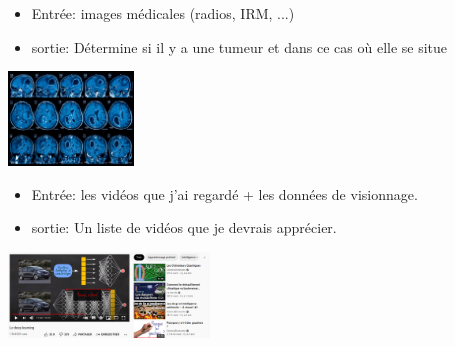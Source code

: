 \begin{myexamples}
		\begin{itemize}
			\item Entrée: images médicales (radios, IRM, ...)
			\item sortie: Détermine si il y a une tumeur et dans ce cas où elle se situe
		\end{itemize}	
	\begin{center}
		\includegraphics[trim=0 0 0 0,width=0.25\textwidth]{Images/intro/MRI_SCAN.jpg}
	\end{center}
\newpage
	\begin{itemize}
		\item Entrée: les vidéos que j'ai regardé + les données de visionnage.
		\item sortie: Un liste de vidéos que je devrais apprécier.
	\end{itemize}
	\begin{center}
		\includegraphics[trim=0 0 0 0,width=0.4\textwidth]{Images/intro/ex_youtube.png}
	\end{center}

\end{myexamples}


